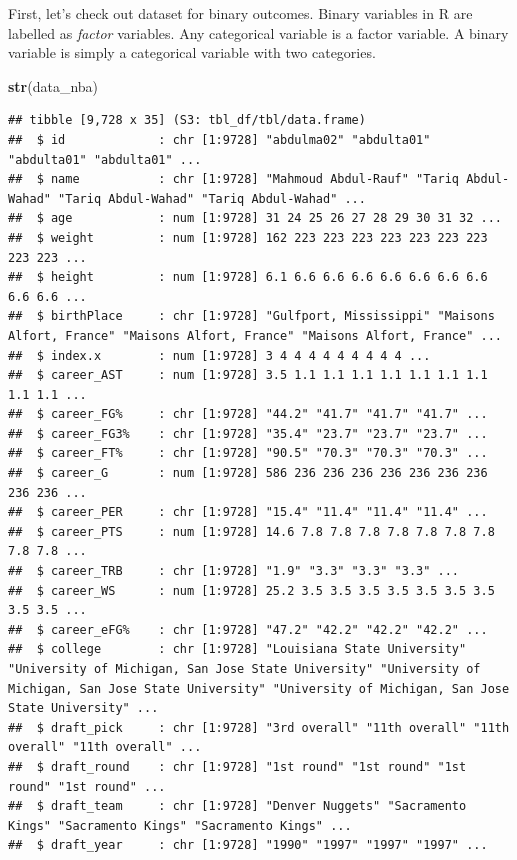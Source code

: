 \documentclass[
]{book}
\newenvironment{Shaded}{\begin{snugshade}}{\end{snugshade}}
\newcommand{\FunctionTok}[1]{\textcolor[rgb]{0.13,0.29,0.53}{\textbf{#1}}}
\newcommand{\NormalTok}[1]{#1}
\begin{document}
First, let's check out dataset for binary outcomes. Binary variables in R are
labelled as \emph{factor} variables. Any categorical variable is a factor variable.
A binary variable is simply a categorical variable with two categories.

\begin{Shaded}
\begin{Highlighting}[]
\FunctionTok{str}\NormalTok{(data\_nba)}
\end{Highlighting}
\end{Shaded}

\begin{verbatim}
## tibble [9,728 x 35] (S3: tbl_df/tbl/data.frame)
##  $ id             : chr [1:9728] "abdulma02" "abdulta01" "abdulta01" "abdulta01" ...
##  $ name           : chr [1:9728] "Mahmoud Abdul-Rauf" "Tariq Abdul-Wahad" "Tariq Abdul-Wahad" "Tariq Abdul-Wahad" ...
##  $ age            : num [1:9728] 31 24 25 26 27 28 29 30 31 32 ...
##  $ weight         : num [1:9728] 162 223 223 223 223 223 223 223 223 223 ...
##  $ height         : num [1:9728] 6.1 6.6 6.6 6.6 6.6 6.6 6.6 6.6 6.6 6.6 ...
##  $ birthPlace     : chr [1:9728] "Gulfport, Mississippi" "Maisons Alfort, France" "Maisons Alfort, France" "Maisons Alfort, France" ...
##  $ index.x        : num [1:9728] 3 4 4 4 4 4 4 4 4 4 ...
##  $ career_AST     : num [1:9728] 3.5 1.1 1.1 1.1 1.1 1.1 1.1 1.1 1.1 1.1 ...
##  $ career_FG%     : chr [1:9728] "44.2" "41.7" "41.7" "41.7" ...
##  $ career_FG3%    : chr [1:9728] "35.4" "23.7" "23.7" "23.7" ...
##  $ career_FT%     : chr [1:9728] "90.5" "70.3" "70.3" "70.3" ...
##  $ career_G       : num [1:9728] 586 236 236 236 236 236 236 236 236 236 ...
##  $ career_PER     : chr [1:9728] "15.4" "11.4" "11.4" "11.4" ...
##  $ career_PTS     : num [1:9728] 14.6 7.8 7.8 7.8 7.8 7.8 7.8 7.8 7.8 7.8 ...
##  $ career_TRB     : chr [1:9728] "1.9" "3.3" "3.3" "3.3" ...
##  $ career_WS      : num [1:9728] 25.2 3.5 3.5 3.5 3.5 3.5 3.5 3.5 3.5 3.5 ...
##  $ career_eFG%    : chr [1:9728] "47.2" "42.2" "42.2" "42.2" ...
##  $ college        : chr [1:9728] "Louisiana State University" "University of Michigan, San Jose State University" "University of Michigan, San Jose State University" "University of Michigan, San Jose State University" ...
##  $ draft_pick     : chr [1:9728] "3rd overall" "11th overall" "11th overall" "11th overall" ...
##  $ draft_round    : chr [1:9728] "1st round" "1st round" "1st round" "1st round" ...
##  $ draft_team     : chr [1:9728] "Denver Nuggets" "Sacramento Kings" "Sacramento Kings" "Sacramento Kings" ...
##  $ draft_year     : chr [1:9728] "1990" "1997" "1997" "1997" ...

\end{verbatim}
\end{document}
